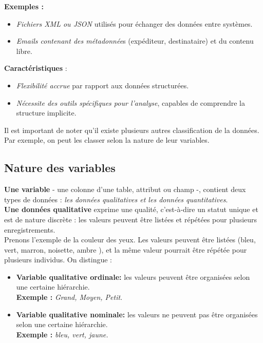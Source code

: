 \documentclass[a4paper,12pt]{report}
\begin{document}
            \textbf{Exemples :}
            \begin{itemize}
                \item \textit{Fichiers XML ou JSON} utilisés pour échanger des données entre systèmes.
                \item \textit{Emails contenant des métadonnée}s (expéditeur, destinataire) et du contenu libre.
            \end{itemize}
            
            \textbf{Caractéristiques }:
            \begin{itemize}
                \item \textit{Flexibilité accrue} par rapport aux données structurées.
                \item \textit{Nécessite des outils spécifiques pour l'analyse}, capables de comprendre la structure implicite.
            \end{itemize}

            Il est important de noter qu’il existe plusieurs autres classification de la données. Par exemple, on peut les classer selon la nature de leur variables. \\

        \subsection{Nature des variables}    
            \textbf{Une variable} - une colonne d'une table, attribut ou champ -, contient deux types de données : \textit{les données qualitatives et les données quantitatives}.\\

            \textbf{Une données qualitative} exprime une qualité, c'est-à-dire un statut unique et est de nature discrète : les valeurs peuvent être listées et répétées pour plusieurs enregistrements. \\ 
            
            Prenons l'exemple de la couleur des yeux. Les valeurs peuvent être listées   (bleu, vert, marron, noisette, ambre ), et la même valeur pourrait être répétée pour plusieurs individus.
            On distingue : 
            \begin{itemize}
                \item \textbf{Variable qualitative ordinale:} les valeurs peuvent être organisées selon une certaine hiérarchie.\\
                \textbf{Exemple :} \textit{Grand, Moyen, Petit}.
                \item \textbf{Variable qualitative nominale:}  les valeurs ne peuvent pas être organisées selon une certaine hiérarchie. \\
                \textbf{Exemple :} \textit{bleu, vert, jaune.}
            \end{itemize}\\
            
\end{document}
